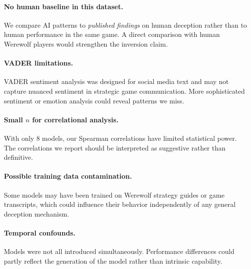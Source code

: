 \paragraph{No human baseline in this dataset.} We compare AI patterns to \emph{published findings} on human deception rather than to human performance in the same game. A direct comparison with human Werewolf players would strengthen the inversion claim.

\paragraph{VADER limitations.} VADER sentiment analysis was designed for social media text and may not capture nuanced sentiment in strategic game communication. More sophisticated sentiment or emotion analysis could reveal patterns we miss.

\paragraph{Small $n$ for correlational analysis.} With only 8 models, our Spearman correlations have limited statistical power. The correlations we report should be interpreted as suggestive rather than definitive.

\paragraph{Possible training data contamination.} Some models may have been trained on Werewolf strategy guides or game transcripts, which could influence their behavior independently of any general deception mechanism.

\paragraph{Temporal confounds.} Models were not all introduced simultaneously. Performance differences could partly reflect the generation of the model rather than intrinsic capability.

